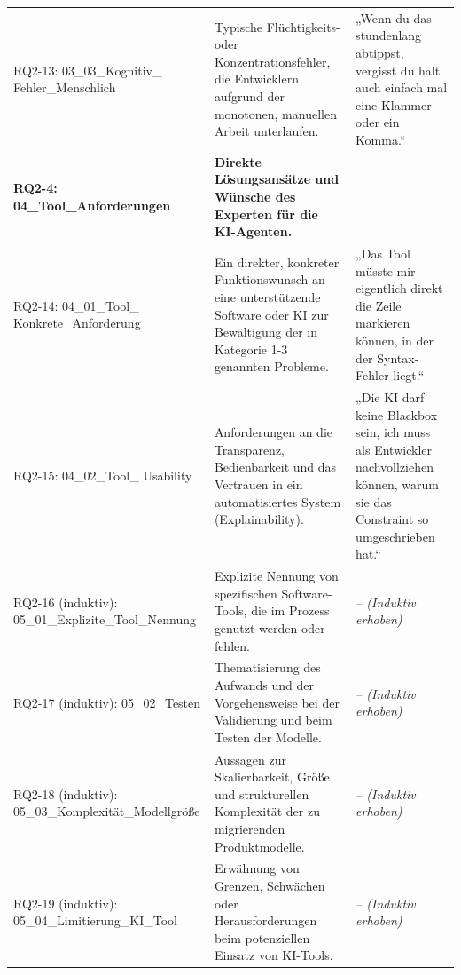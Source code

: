 \documentclass[12pt, a4paper, oneside]{book}
\begin{document}
\begin{xltabular}{\textwidth}{@{} 
    >{\raggedright\arraybackslash}p{4.8cm} 
    >{\raggedright\arraybackslash}p{4.2cm} 
    >{\raggedright\arraybackslash}X @{}}
    RQ2-13: 03\_03\_Kognitiv\_ \newline Fehler\_Menschlich & 
    Typische Flüchtigkeits- oder Konzentrationsfehler, die Entwicklern aufgrund der monotonen, manuellen Arbeit unterlaufen. & 
    „Wenn du das stundenlang abtippst, vergisst du halt auch einfach mal eine Klammer oder ein Komma.“ \\
    \addlinespace
    
    \textbf{RQ2-4: 04\_Tool\_Anforderungen} & 
    \textbf{Direkte Lösungsansätze und Wünsche des Experten für die KI-Agenten.} & 
    \\
    
    RQ2-14: 04\_01\_Tool\_ \newline Konkrete\_Anforderung & 
    Ein direkter, konkreter Funktionswunsch an eine unterstützende Software oder KI zur Bewältigung der in Kategorie 1-3 genannten Probleme. & 
    „Das Tool müsste mir eigentlich direkt die Zeile markieren können, in der der Syntax-Fehler liegt.“ \\
    
    RQ2-15: 04\_02\_Tool\_ \newline Usability & 
    Anforderungen an die Transparenz, Bedienbarkeit und das Vertrauen in ein automatisiertes System (Explainability). & 
    „Die KI darf keine Blackbox sein, ich muss als Entwickler nachvollziehen können, warum sie das Constraint so umgeschrieben hat.“ \\
    \addlinespace

    
    RQ2-16 (induktiv): 05\_01\_Explizite\_Tool\_Nennung & 
    Explizite Nennung von spezifischen Software-Tools, die im Prozess genutzt werden oder fehlen. & 
    \textit{-- (Induktiv erhoben)} \\
    
    RQ2-17 (induktiv): 05\_02\_Testen & 
    Thematisierung des Aufwands und der Vorgehensweise bei der Validierung und beim Testen der Modelle. & 
    \textit{-- (Induktiv erhoben)} \\
    
    RQ2-18 (induktiv): 05\_03\_Komplexität\_Modellgröße & 
    Aussagen zur Skalierbarkeit, Größe und strukturellen Komplexität der zu migrierenden Produktmodelle. & 
    \textit{-- (Induktiv erhoben)} \\
    
    RQ2-19 (induktiv): 05\_04\_Limitierung\_KI\_Tool & 
    Erwähnung von Grenzen, Schwächen oder Herausforderungen beim potenziellen Einsatz von KI-Tools. & 
    \textit{-- (Induktiv erhoben)} \\

\end{xltabular}
\newpage
\end{document}
